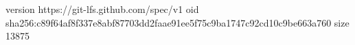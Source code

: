 version https://git-lfs.github.com/spec/v1
oid sha256:c89f64af8f337e8abf87703dd2faae91ee5f75c9ba1747c92cd10c9be663a760
size 13875
